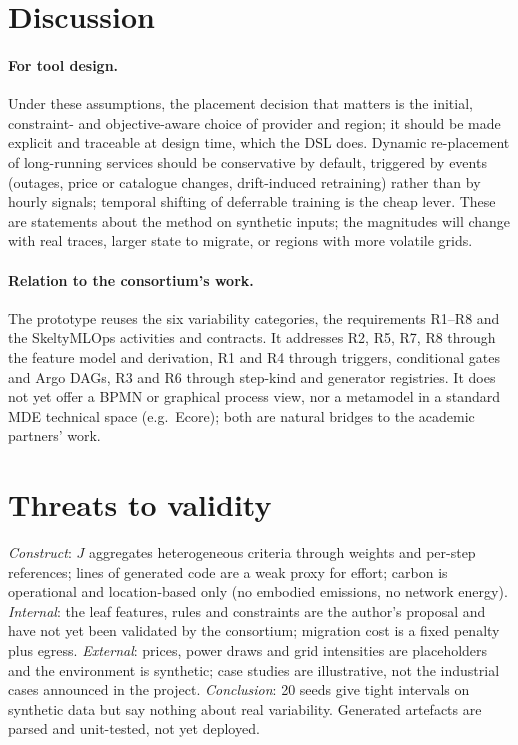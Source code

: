 \documentclass[10pt,a4paper]{article}
\begin{document}
\section{Discussion}
\paragraph{For tool design.} Under these assumptions, the placement decision that
matters is the initial, constraint- and objective-aware choice of provider and
region; it should be made explicit and traceable at design time, which the DSL does.
Dynamic re-placement of long-running services should be conservative by default,
triggered by events (outages, price or catalogue changes, drift-induced retraining)
rather than by hourly signals; temporal shifting of deferrable training is the
cheap lever. These are statements about the method on synthetic inputs; the
magnitudes will change with real traces, larger state to migrate, or regions with
more volatile grids.

\paragraph{Relation to the consortium's work.} The prototype reuses the six
variability categories, the requirements R1--R8 and the SkeltyMLOps activities and
contracts. It addresses R2, R5, R7, R8 through the feature model and derivation,
R1 and R4 through triggers, conditional gates and Argo DAGs, R3 and R6 through
step-kind and generator registries. It does not yet offer a BPMN or graphical
process view, nor a metamodel in a standard MDE technical space (e.g.\ Ecore); both
are natural bridges to the academic partners' work.

\section{Threats to validity}
\emph{Construct}: \(J\) aggregates heterogeneous criteria through weights and
per-step references; lines of generated code are a weak proxy for effort; carbon is
operational and location-based only (no embodied emissions, no network energy).
\emph{Internal}: the leaf features, rules and constraints are the author's proposal
and have not yet been validated by the consortium; migration cost is a fixed
penalty plus egress. \emph{External}: prices, power draws and grid intensities are
placeholders and the environment is synthetic; case studies are illustrative, not the
industrial cases announced in the project. \emph{Conclusion}: 20 seeds give tight
intervals on synthetic data but say nothing about real variability. Generated
artefacts are parsed and unit-tested, not yet deployed.
\end{document}
